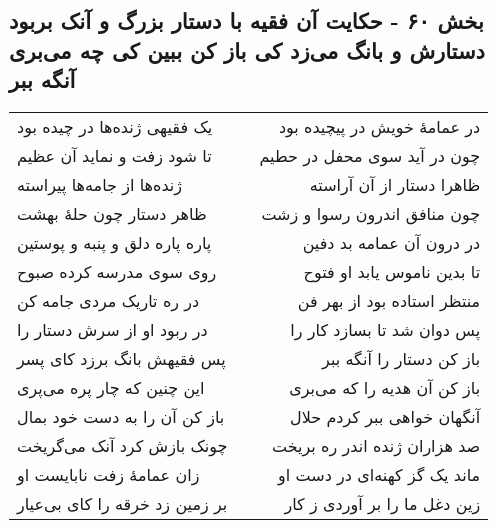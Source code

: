 \begin{center}
\section*{بخش ۶۰ - حکایت آن فقیه با دستار بزرگ و  آنک بربود دستارش و بانگ می‌زد کی باز کن ببین کی چه می‌بری آنگه ببر}
\label{sec:sh060}
\begin{longtable}{l p{0.5cm} r}
یک فقیهی ژنده‌ها در چیده بود
&&
در عمامهٔ خویش در پیچیده بود
\\
تا شود زفت و نماید آن عظیم
&&
چون در آید سوی محفل در حطیم
\\
ژنده‌ها از جامه‌ها پیراسته
&&
ظاهرا دستار از آن آراسته
\\
ظاهر دستار چون حلهٔ بهشت
&&
چون منافق اندرون رسوا و زشت
\\
پاره پاره دلق و پنبه و پوستین
&&
در درون آن عمامه بد دفین
\\
روی سوی مدرسه کرده صبوح
&&
تا بدین ناموس یابد او فتوح
\\
در ره تاریک مردی جامه کن
&&
منتظر استاده بود از بهر فن
\\
در ربود او از سرش دستار را
&&
پس دوان شد تا بسازد کار را
\\
پس فقیهش بانگ برزد کای پسر
&&
باز کن دستار را آنگه ببر
\\
این چنین که چار پره می‌پری
&&
باز کن آن هدیه را که می‌بری
\\
باز کن آن را به دست خود بمال
&&
آنگهان خواهی ببر کردم حلال
\\
چونک بازش کرد آنک می‌گریخت
&&
صد هزاران ژنده اندر ره بریخت
\\
زان عمامهٔ زفت نابایست او
&&
ماند یک گز کهنه‌ای در دست او
\\
بر زمین زد خرقه را کای بی‌عیار
&&
زین دغل ما را بر آوردی ز کار
\\
\end{longtable}
\end{center}
